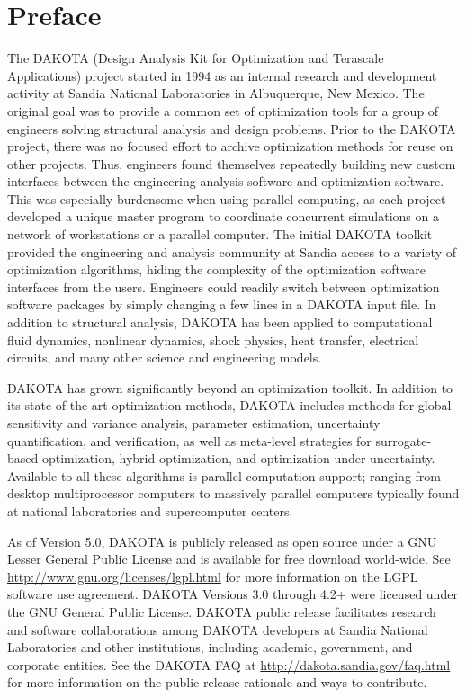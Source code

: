 \chapter*{Preface}

The DAKOTA (Design Analysis Kit for Optimization and Terascale
Applications) project started in 1994 as an internal research and
development activity at Sandia National Laboratories in Albuquerque,
New Mexico. The original goal was to provide a common set of
optimization tools for a group of engineers solving structural
analysis and design problems. Prior to the DAKOTA project, there was
no focused effort to archive optimization methods for reuse on other
projects. Thus, engineers found themselves repeatedly building new
custom interfaces between the engineering analysis software and
optimization software. This was especially burdensome when using
parallel computing, as each project developed a unique master program
to coordinate concurrent simulations on a network of workstations or a
parallel computer. The initial DAKOTA toolkit provided the engineering
and analysis community at Sandia access to a variety of optimization
algorithms, hiding the complexity of the optimization software
interfaces from the users. Engineers could readily switch between
optimization software packages by simply changing a few lines in a
DAKOTA input file. In addition to structural analysis, DAKOTA has been
applied to computational fluid dynamics, nonlinear dynamics, shock
physics, heat transfer, electrical circuits, and many other science
and engineering models.

DAKOTA has grown significantly beyond an optimization toolkit.  In
addition to its state-of-the-art optimization methods, DAKOTA includes
methods for global sensitivity and variance analysis, parameter
estimation, uncertainty quantification, and verification, as well as
meta-level strategies for surrogate-based optimization, hybrid
optimization, and optimization under uncertainty. Available to all
these algorithms is parallel computation support; ranging from desktop
multiprocessor computers to massively parallel computers typically
found at national laboratories and supercomputer centers.

As of Version 5.0, DAKOTA is publicly released as open source under a
GNU Lesser General Public License and is available for free download
world-wide.  See \url{http://www.gnu.org/licenses/lgpl.html} for more
information on the LGPL software use agreement.  DAKOTA Versions 3.0
through 4.2+ were licensed under the GNU General Public License.
DAKOTA public release facilitates research and software collaborations
among DAKOTA developers at Sandia National Laboratories and other
institutions, including academic, government, and corporate
entities. See the DAKOTA FAQ at
\url{http://dakota.sandia.gov/faq.html} for more information on the
public release rationale and ways to contribute.

